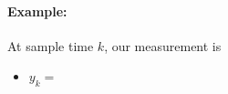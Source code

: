 \paragraph{Example: }
At sample time $k$, our measurement is
\begin{itemize}
	\item $y_k = $
\end{itemize}






